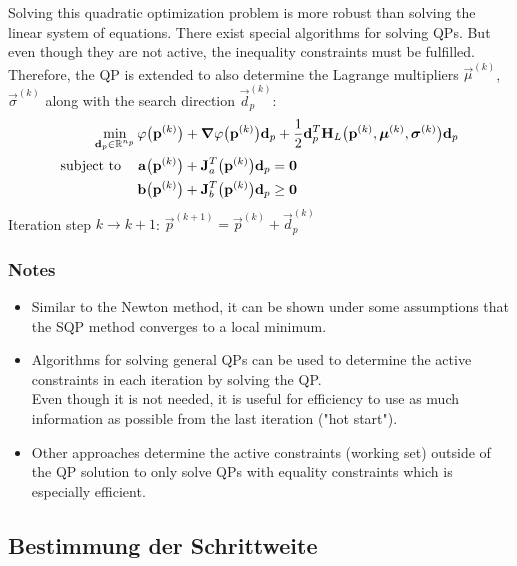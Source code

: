 				
				Solving this quadratic optimization problem is more robust than solving the linear system of equations. There exist special algorithms for solving QPs. But even though they are not active, the inequality constraints must be fulfilled. Therefore, the QP is extended to also determine the Lagrange multipliers \( \vec{\mu}^{(k)} \), \( \vec{\sigma}^{(k)} \) along with the search direction \( \vec{d}_p^{(k)} \):
				\begin{align*}
					\min_{\boldsymbol{\mathrm{d}}_p \in \mathbb{R}^{n_p}} &\, \varphi\big(\boldsymbol{\mathrm{p}}^{(k)}\big) + \grad{\varphi}\big(\boldsymbol{\mathrm{p}}^{(k)}\big) \boldsymbol{\mathrm{d}}_p + \frac{1}{2} \boldsymbol{\mathrm{d}}_p^T \boldsymbol{\mathrm{H}}_L\big(\boldsymbol{\mathrm{p}}^{(k)}, \boldsymbol{\mathrm{\mu}}^{(k)}, \boldsymbol{\mathrm{\sigma}}^{(k)}\big) \boldsymbol{\mathrm{d}}_p \\
					\mathrm{subject~to}\quad &\,
						\begin{alignedat}[t]{2}
							\boldsymbol{\mathrm{a}}\big(\boldsymbol{\mathrm{p}}^{(k)}\big) + \boldsymbol{\mathrm{J}}_a^T\big(\boldsymbol{\mathrm{p}}^{(k)}\big) \boldsymbol{\mathrm{d}}_p &= \boldsymbol{\mathrm{0}} \\
							\boldsymbol{\mathrm{b}}\big(\boldsymbol{\mathrm{p}}^{(k)}\big) + \boldsymbol{\mathrm{J}}_b^T\big(\boldsymbol{\mathrm{p}}^{(k)}\big) \boldsymbol{\mathrm{d}}_p & \geq \boldsymbol{\mathrm{0}}
						\end{alignedat}
				\end{align*}
				Iteration step \( k \to k + 1 \): \( \vec{p}^{(k + 1)} = \vec{p}^{(k)} + \vec{d}_p^{(k)} \)
			
			\subsubsection{Notes}
				\begin{itemize}
					\item Similar to the Newton method, it can be shown under some assumptions that the SQP method converges to a local minimum.
					\item Algorithms for solving general QPs can be used to determine the active constraints in each iteration by solving the QP. \\ Even though it is not needed, it is useful for efficiency to use as much information as possible from the last iteration ("hot start").
					\item Other approaches determine the active constraints (working set) outside of the QP solution to only solve QPs with equality constraints which is especially efficient.
				\end{itemize}

		\subsection{Bestimmung der Schrittweite} %

